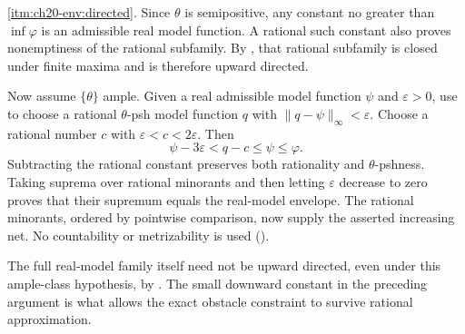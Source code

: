 \cref{itm:ch20-env:directed}.  Since \(\theta\) is semipositive, any
constant no greater than \(\inf\varphi\) is an admissible real model
function.  A rational such constant also proves nonemptiness of the
rational subfamily.  By , that rational
subfamily is closed under finite maxima and is therefore upward directed.

Now assume \(\{\theta\}\) ample.  Given a real admissible model function
\(\psi\) and \(\varepsilon>0\), use
 to choose a rational
\(\theta\)-psh model function \(q\) with
\(\|q-\psi\|_\infty<\varepsilon\).  Choose a rational number
\(c\) with \(\varepsilon<c<2\varepsilon\).  Then
\[
             \psi-3\varepsilon<q-c\leq\psi\leq\varphi.
\]
Subtracting the rational constant preserves both rationality and
\(\theta\)-pshness.  Taking suprema over rational minorants and then
letting \(\varepsilon\) decrease to zero proves that their supremum
equals the real-model envelope.  The rational minorants, ordered by
pointwise comparison, now supply the asserted increasing net.  No
countability or metrizability is used ().

The full real-model family itself need not be upward directed, even
under this ample-class hypothesis, by
.  The small downward
constant in the preceding argument is what allows the exact obstacle
constraint to survive rational approximation.

